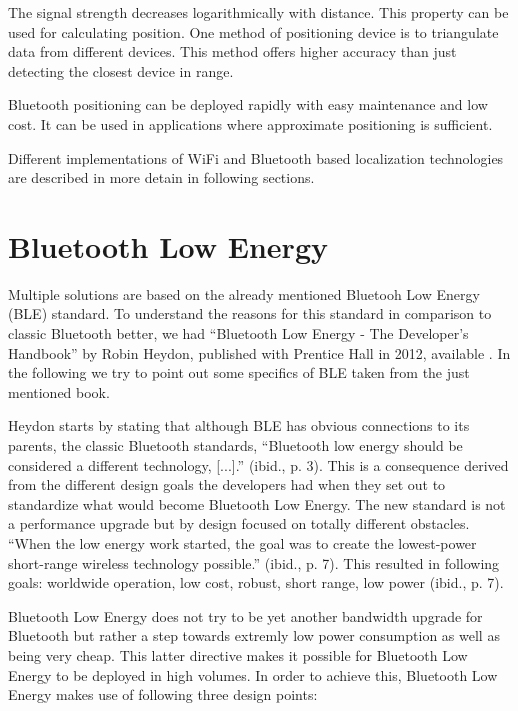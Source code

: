 The signal strength decreases logarithmically with distance. This property can be used for calculating position. One method of positioning device is to triangulate data from different devices. This method offers higher accuracy than just detecting the closest device in range.

Bluetooth positioning can be deployed rapidly with easy maintenance and low cost. It can be used in applications where approximate positioning is sufficient.

Different implementations of WiFi and Bluetooth based localization technologies are described in more detain in following sections.


\vspace{0.5cm}

\section{Bluetooth Low Energy}

Multiple solutions are based on the already mentioned Bluetooh Low Energy (BLE) standard. To understand the reasons for this standard in comparison to classic Bluetooth better, we had \enquote{Bluetooth Low Energy - The Developer's Handbook} by Robin Heydon, published with Prentice Hall in 2012, available \cite{heydon2012bluetooth}. In the following we try to point out some specifics of BLE taken from the just mentioned book.

Heydon starts by stating that although BLE has obvious connections to its parents, the classic Bluetooth standards, \enquote{Bluetooth low energy should be considered a different technology, [...].} (ibid., p. 3). This is a consequence derived from the different design goals the developers had when they set out to standardize what would become Bluetooth Low Energy. The new standard is not a performance upgrade but by design focused on totally different obstacles. \enquote{When the low energy work started, the goal was to create the lowest-power short-range wireless technology possible.} (ibid., p. 7). This resulted in following goals: worldwide operation, low cost, robust, short range, low power (ibid., p. 7).

Bluetooth Low Energy does not try to be yet another bandwidth upgrade for Bluetooth but rather a step towards extremly low power consumption as well as being very cheap. This latter directive makes it possible for Bluetooth Low Energy to be deployed in high volumes. In order to achieve this, Bluetooth Low Energy makes use of following three design points:

